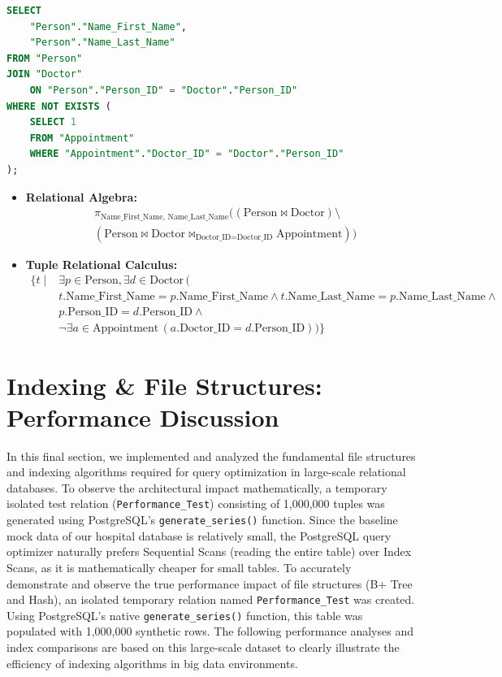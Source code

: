 \documentclass[12pt,a4paper]{article}
\begin{document}
\begin{enumerate}
	      \begin{lstlisting}[language=SQL, caption=Query: Doctors with No Appointments, basicstyle=\ttfamily\footnotesize, breaklines=true]
SELECT 
    "Person"."Name_First_Name",
    "Person"."Name_Last_Name"
FROM "Person"
JOIN "Doctor"
    ON "Person"."Person_ID" = "Doctor"."Person_ID"
WHERE NOT EXISTS (
    SELECT 1
    FROM "Appointment"
    WHERE "Appointment"."Doctor_ID" = "Doctor"."Person_ID"
);
\end{lstlisting}
	      \begin{itemize}
		      \item \textbf{Relational Algebra:}
		            $$ \begin{aligned} & \pi_{\text{Name\_First\_Name, Name\_Last\_Name}} ((\text{Person} \bowtie \text{Doctor}) \setminus \\ & (\text{Person} \bowtie \text{Doctor} \bowtie_{\text{Doctor\_ID}=\text{Doctor\_ID}} \text{Appointment})) \end{aligned} $$
		      \item \textbf{Tuple Relational Calculus:}
		            $$ \begin{aligned} \{ t \mid & \exists p \in \text{Person}, \exists d \in \text{Doctor} \, ( \\ & t.\text{Name\_First\_Name} = p.\text{Name\_First\_Name} \land t.\text{Name\_Last\_Name} = p.\text{Name\_Last\_Name} \land \\ & p.\text{Person\_ID} = d.\text{Person\_ID} \land \\ & \neg \exists a \in \text{Appointment} \, (a.\text{Doctor\_ID} = d.\text{Person\_ID})) \} \end{aligned} $$
	      \end{itemize}

\end{enumerate}

\section{Indexing \& File Structures: Performance Discussion}

In this final section, we implemented and analyzed the fundamental file structures and indexing algorithms required for query optimization in large-scale relational databases. To observe the architectural impact mathematically, a temporary isolated test relation (\texttt{Performance\_Test}) consisting of 1,000,000 tuples was generated using PostgreSQL's \texttt{generate\_series()} function.
Since the baseline mock data of our hospital database is relatively small, the PostgreSQL query optimizer naturally prefers Sequential Scans (reading the entire table) over Index Scans, as it is mathematically cheaper for small tables. To accurately demonstrate and observe the true performance impact of file structures (B+ Tree and Hash), an isolated temporary relation named \texttt{Performance\_Test} was created. Using PostgreSQL's native \texttt{generate\_series()} function, this table was populated with 1,000,000 synthetic rows. The following performance analyses and index comparisons are based on this large-scale dataset to clearly illustrate the efficiency of indexing algorithms in big data environments.
\end{document}

